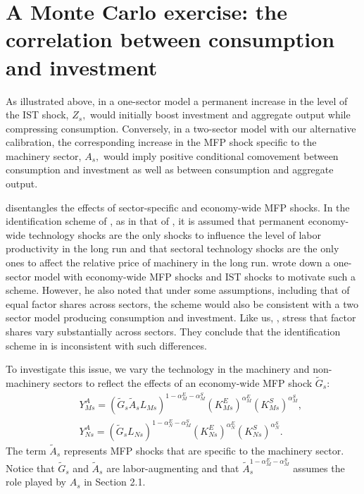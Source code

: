 \documentclass[12pt,fleqn]{article}
\begin{document}
\section{\protect\normalsize A Monte Carlo exercise: the correlation between
consumption and investment}

{\normalsize As illustrated above, in a one-sector model a permanent
increase in the level of the IST shock, $Z_{s},$ would initially boost
investment and aggregate output while compressing consumption. Conversely,
in a two-sector model with our alternative calibration, the corresponding
increase in the MFP shock specific to the machinery sector, $A_{s},$ would
imply positive conditional comovement between consumption and investment as
well as between consumption and aggregate output. }

{\normalsize {} disentangles the effects of sector-specific
and economy-wide MFP shocks. In the identification scheme of %
, as in that of , it is assumed that
permanent economy-wide technology shocks are the only shocks to influence
the level of labor productivity in the long run and that sectoral technology
shocks are the only ones to affect the relative price of machinery in the
long run.  wrote down a one-sector model with economy-wide
MFP shocks and IST shocks to motivate such a scheme. However, he also noted
that under some assumptions, including that of equal factor shares across
sectors, the scheme would also be consistent with a two sector model
producing consumption and investment. Like us, , stress that
factor shares vary substantially across sectors. They conclude that the
identification scheme in  is inconsistent with such
differences. }

{\normalsize To investigate this issue, we vary the technology in the
machinery and non-machinery sectors to reflect the effects of an
economy-wide MFP shock $\tilde{G}_s$:
\begin{eqnarray}
&& Y^A_{Ms}= \left( \tilde{G}_s \tilde{A}_s L_{Ms}\right)
^{1-\alpha_{M}^{E}-\alpha _{M}^{S}}\left( K_{Ms}^{E}\right) ^{\alpha
_{M}^{E}}\left( K_{Ms}^{S}\right) ^{\alpha_{M}^{S}}, \\
&& Y^A_{Ns}= \left( \tilde{G}_s L_{Ns}\right) ^{1-\alpha_{N}^{E}-\alpha
_{M}^{S}}\left( K_{Ns}^{E}\right) ^{\alpha _{N}^{E}}\left( K_{Ns}^{S}\right)
^{\alpha_{N}^{S}}.
\end{eqnarray}
The term $\tilde{A}_s$ represents MFP shocks that are specific to the
machinery sector. Notice that $\tilde{G}_s$ and $\tilde{A}_s$ are
labor-augmenting and that $\tilde{A}_s^{1-\alpha_{M}^{E}-\alpha _{M}^{S}}$
assumes the role played by $A_s$ in Section 2.1. }
\end{document}
